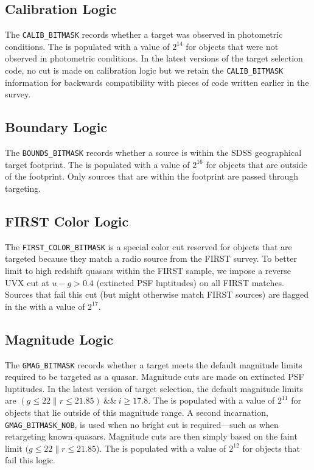 \documentclass{emulateapj}
\begin{document}
\subsection{Calibration Logic}
	The {\tt CALIB\_BITMASK} records whether a target was observed in photometric conditions. The \fb is populated with a value of $2^{14}$ for objects that were not observed in photometric conditions. In the latest versions of the target selection code, no cut is made on calibration logic but we retain the {\tt CALIB\_BITMASK} information for backwards compatibility with pieces of code written earlier in the survey.

\subsection{Boundary Logic}
	The {\tt BOUNDS\_BITMASK} records whether a source is within the SDSS geographical target footprint. The \fb is populated with a value of $2^{16}$ for objects that are outside of the footprint. Only sources that are within the footprint are passed through targeting.

\subsection{FIRST Color Logic}
	The {\tt FIRST\_COLOR\_BITMASK} is a special color cut reserved for objects that are targeted because they match a radio source from the FIRST survey. To better limit to high redshift quasars within the FIRST sample, we impose a reverse UVX cut at $u - g > 0.4$ (extincted PSF luptitudes) on all FIRST matches. Sources that fail this cut (but might otherwise match FIRST sources) are flagged in the \fb with a value of $2^{17}$.

\subsection{Magnitude Logic}
	The {\tt GMAG\_BITMASK} records whether a target meets the default magnitude limits required to be targeted as a quasar. Magnitude cuts are made on extincted PSF luptitudes. In the latest version of target selection, the default magnitude limits are $(g \le 22 \parallel r \le 21.85)~\&\&~i \ge 17.8$.  The \fb is populated with a value of $2^{11}$ for objects that lie outside of this magnitude range. A second incarnation, {\tt GMAG\_BITMASK\_NOB}, is used when no bright cut is required---such as when retargeting known quasars. Magnitude cuts are then simply based on the faint limit $(g \le 22 \parallel r \le 21.85$).  The \fb is populated with a value of $2^{12}$ for objects that fail this logic.
\end{document}
